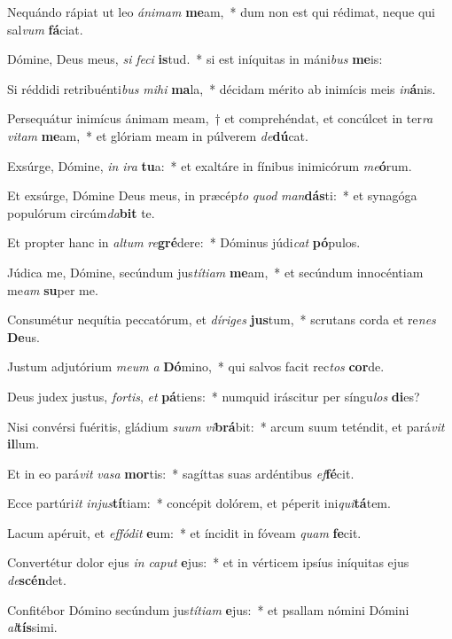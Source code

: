 \item Nequándo rápiat ut leo \textit{á}\textit{ni}\textit{mam} \textbf{me}am,~* dum non est qui rédimat, neque qui sal\textit{vum} \textbf{fá}ciat.
\item Dómine, Deus meus, \textit{si} \textit{fe}\textit{ci} \textbf{is}tud.~* si est iníquitas in máni\textit{bus} \textbf{me}is:
\item Si réddidi retribuénti\textit{bus} \textit{mi}\textit{hi} \textbf{ma}la,~* décidam mérito ab inimícis meis \textit{in}\textbf{á}nis.
\item Persequátur inimícus ánimam meam,~† et comprehéndat, et concúlcet in ter\textit{ra} \textit{vi}\textit{tam} \textbf{me}am,~* et glóriam meam in púlverem \textit{de}\textbf{dú}cat.
\item Exsúrge, Dómine, \textit{in} \textit{i}\textit{ra} \textbf{tu}a:~* et exaltáre in fínibus inimicórum \textit{me}\textbf{ó}rum.
\item Et exsúrge, Dómine Deus meus, in præcép\textit{to} \textit{quod} \textit{man}\textbf{dás}ti:~* et synagóga populórum circúm\textit{da}\textbf{bit} te.
\item Et propter hanc in \textit{al}\textit{tum} \textit{re}\textbf{gré}dere:~* Dóminus júdi\textit{cat} \textbf{pó}pulos.
\item Júdica me, Dómine, secúndum jus\textit{tí}\textit{ti}\textit{am} \textbf{me}am,~* et secúndum innocéntiam me\textit{am} \textbf{su}per me.
\item Consumétur nequítia peccatórum, et \textit{dí}\textit{ri}\textit{ges} \textbf{jus}tum,~* scrutans corda et re\textit{nes} \textbf{De}us.
\item Justum adjutórium \textit{me}\textit{um} \textit{a} \textbf{Dó}mino,~* qui salvos facit rec\textit{tos} \textbf{cor}de.
\item Deus judex justus, \textit{for}\textit{tis}, \textit{et} \textbf{pá}tiens:~* numquid iráscitur per síngu\textit{los} \textbf{di}es?
\item Nisi convérsi fuéritis, gládium \textit{su}\textit{um} \textit{vi}\textbf{brá}bit:~* arcum suum teténdit, et pará\textit{vit} \textbf{il}lum.
\item Et in eo pará\textit{vit} \textit{va}\textit{sa} \textbf{mor}tis:~* sagíttas suas ardéntibus \textit{ef}\textbf{fé}cit.
\item Ecce partúri\textit{it} \textit{in}\textit{jus}\textbf{tí}tiam:~* concépit dolórem, et péperit ini\textit{qui}\textbf{tá}tem.
\item Lacum apéruit, et \textit{ef}\textit{fó}\textit{dit} \textbf{e}um:~* et íncidit in fóveam \textit{quam} \textbf{fe}cit.
\item Convertétur dolor ejus \textit{in} \textit{ca}\textit{put} \textbf{e}jus:~* et in vérticem ipsíus iníquitas ejus \textit{de}\textbf{scén}det.
\item Confitébor Dómino secúndum jus\textit{tí}\textit{ti}\textit{am} \textbf{e}jus:~* et psallam nómini Dómini \textit{al}\textbf{tís}simi.
